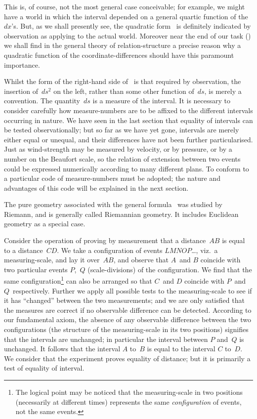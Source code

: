 \documentclass[12pt]{book}
\begin{document}
This is, of course, not the most general case conceivable; for example, we
might have a world in which the interval depended on a general quartic
function of the~$dx$'s. But, as we shall presently see, the quadratic form~ is
definitely indicated by observation as applying to the actual world. Moreover
near the end of our task () we shall find in the general theory of relation-structure
a precise reason why a quadratic function of the coordinate-differences
should have this paramount importance.

Whilst the form of the right-hand side of~ is that required by
observation, the insertion of~$ds^{2}$ on the left, rather than some other function
of~$ds$, is merely a convention. The quantity~$ds$ is a measure of the interval.
%
%
It is necessary to consider carefully how measure-numbers are to be affixed
to the different intervals occurring in nature. We have seen in the last
section that equality of intervals can be tested observationally; but so far
as we have yet gone, intervals are merely either equal or unequal, and their
differences have not been further particularised. Just as wind-strength may
be measured by velocity, or by pressure, or by a number on the Beaufort
scale, so the relation of extension between two events could be expressed
numerically according to many different plans. To conform to~ a
particular code of measure-numbers must be adopted; the nature and
advantages of this code will be explained in the next section.

The pure geometry associated with the general formula~ was studied
by Riemann, and is generally called Riemannian geometry. It includes
%
%
Euclidean geometry as a special case.


Consider the operation of proving by measurement that a distance~$AB$ is
equal to a distance~$CD$. We take a configuration of events $LMNOP$\dots, viz.\ a
measuring-scale, and lay it over~$AB$, and observe that $A$~and $B$ coincide with
two particular events $P$,~$Q$ (scale-divisions) of the configuration. We find
that the same configuration\footnote
  {The logical point may be noticed that the measuring-scale in two positions (necessarily at
  different times) represents the same \emph{configuration} of events, not the same events.}
can also be arranged so that $C$~and $D$ coincide
with $P$~and $Q$~respectively. Further we apply all possible tests to the
measuring-scale to see if it has ``changed'' between the two measurements;
and we are only satisfied that the measures are correct if no observable
difference can be detected. According to our fundamental axiom, the absence
of any observable difference between the two configurations (the structure of
the measuring-scale in its two positions) signifies that the intervals are unchanged;
in particular the interval between $P$ and~$Q$ is unchanged. It follows
that the interval $A$ to~$B$ is equal to the interval $C$ to~$D$. We consider that the
experiment proves equality of distance; but it is primarily a test of equality
of interval.
\end{document}
